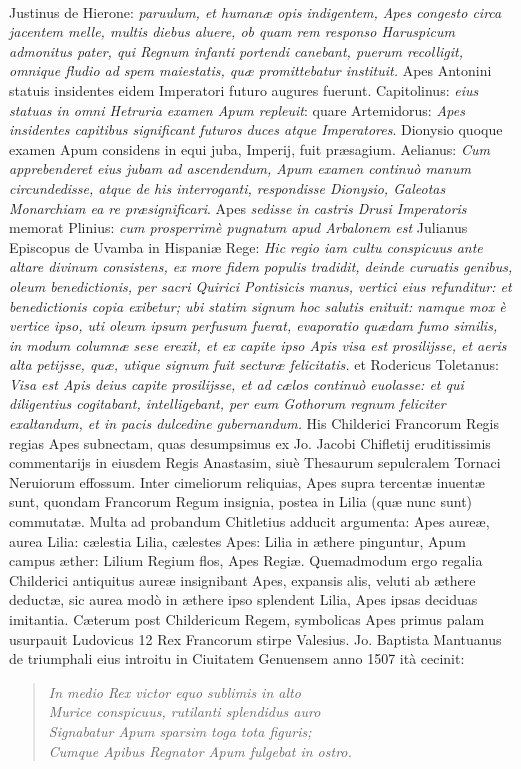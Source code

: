 \documentclass[a4paper, 11pt, oneside, polutonikogreek, latin]{article}
\begin{document}
\paragraph{}
Justinus de Hierone: \emph{paruulum, et humanæ opis indigentem, Apes congesto circa jacentem melle, multis diebus aluere, ob quam rem responso Haruspicum admonitus pater, qui Regnum infanti portendi canebant, puerum recolligit, omnique fludio ad spem maiestatis, quæ promittebatur instituit.} Apes Antonini statuis insidentes eidem Imperatori futuro augures fuerunt. Capitolinus: \emph{eius statuas in omni Hetruria examen Apum repleuit}: quare Artemidorus: \emph{Apes insidentes capitibus significant futuros duces atque Imperatores}. Dionysio quoque examen Apum considens in equi juba, Imperij, fuit præsagium. Aelianus: \emph{Cum apprebenderet eius jubam ad ascendendum, Apum examen continuò manum circundedisse, atque de his interroganti, respondisse Dionysio, Galeotas Monarchiam ea re præsignificari}. Apes \emph{sedisse in castris Drusi Imperatoris} memorat Plinius: \emph{cum prosperrimè pugnatum apud Arbalonem est} Julianus Episcopus de Uvamba in Hispaniæ Rege: \emph{Hic regio iam cultu conspicuus ante altare divinum consistens, ex more fidem populis tradidit, deinde curuatis genibus, oleum benedictionis, per sacri Quirici Pontisicis manus, vertici eius refunditur: et benedictionis copia exibetur; ubi statim signum hoc salutis enituit: namque mox è vertice ipso, uti oleum ipsum perfusum fuerat, evaporatio quædam fumo similis, in modum columnæ sese erexit, et ex capite ipso Apis visa est prosilijsse, et aeris alta petijsse, quæ, utique signum fuit secturæ felicitatis.} et Rodericus Toletanus: \emph{Visa est Apis deius capite prosilijsse, et ad cælos continuò euolasse: et qui diligentius cogitabant, intelligebant, per eum Gothorum regnum feliciter exaltandum, et in pacis dulcedine gubernandum.} His Childerici Francorum Regis regias Apes subnectam, quas desumpsimus ex Jo. Jacobi Chifletij eruditissimis commentarijs in eiusdem Regis Anastasim, siuè Thesaurum sepulcralem Tornaci Neruiorum effossum. Inter cimeliorum reliquias, Apes supra tercentæ inuentæ sunt, quondam Francorum Regum insignia, postea in Lilia (quæ nunc sunt) commutatæ. Multa ad probandum Chitletius adducit argumenta: Apes aureæ, aurea Lilia: cælestia Lilia, cælestes Apes: Lilia in æthere pinguntur, Apum campus æther: Lilium Regium flos, Apes Regiæ. Quemadmodum ergo regalia Childerici antiquitus aureæ insignibant Apes, expansis alis, veluti ab æthere deductæ, sic aurea modò in æthere ipso splendent Lilia, Apes ipsas deciduas imitantia. Cæterum post Childericum Regem, symbolicas Apes primus palam usurpauit Ludovicus 12 Rex Francorum stirpe Valesius. Jo. Baptista Mantuanus de triumphali eius introitu in Ciuitatem Genuensem anno 1507 ità cecinit:
\begin{quote}
\emph{In medio Rex victor equo sublimis in alto}\\
\emph{Murice conspicuus, rutilanti splendidus auro}\\
\emph{Signabatur Apum sparsim toga tota figuris;}\\
\emph{Cumque Apibus Regnator Apum fulgebat in ostro.}\\
\end{quote}
\vspace*{-8mm}
\end{document}
